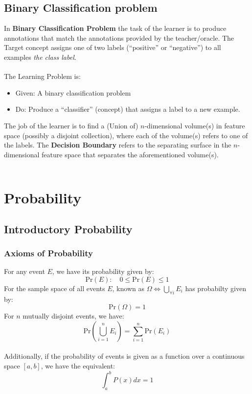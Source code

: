 \documentclass[12pt, a4paper]{book}
\begin{document}
\section{Binary Classification problem}
In \textbf{Binary Classification Problem} the task of the learner is to  produce annotations that match the annotations provided by the teacher/oracle. The Target concept assigns one of two labels (“positive” or “negative”) to all examples \textit{the
class label}.\\\\
The Learning Problem is:
\begin{itemize}
    \item Given: A binary classification problem
    \item Do: Produce a “classifier” (concept) that assigns a label to a new example.\\
\end{itemize}
The job of the learner is to find a (Union of) $n$-dimensional volume(s) in feature space (possibly a disjoint collection), where each of the volume(s) refers to one of the labels. The \textbf{Decision Boundary} refers to the separating surface in the $n$-dimensional feature space that separates the aforementioned volume(s).\\\\
\newpage



\chapter{Probability}

\section{Introductory Probability}
\subsection{Axioms of Probability}
For any event $E$, we have its probability given by:
$$\text{Pr}(E): \quad 0 \leq \text{Pr}(E) \leq 1$$
For the sample space of all events $E$, known as $\Omega \iff \bigcup_{\forall i}E_i$ has probabilty given by:
$$\text{Pr}(\Omega) = 1$$
For $n$ mutually disjoint events, we have:
$$\text{Pr}(\bigcup_{i=1}^nE_i) = \sum^n_{i=1}\text{Pr}(E_i)$$\\
Additionally, if the probability of events is given as a function over a continuous space $[a,b]$, we have the equivalent:
$$\int^{b}_{a}P(x)dx = 1$$
\end{document}
